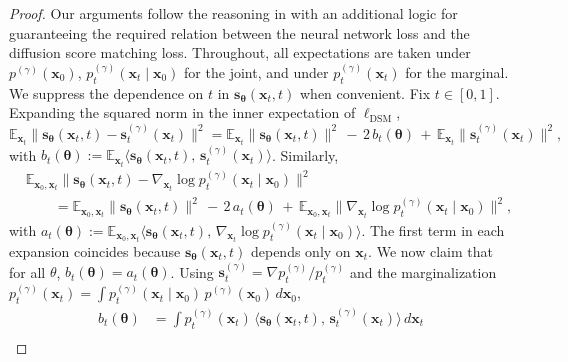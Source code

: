 \documentclass[11pt]{article}
\newcommand{\vect}[1]{\mathbf{#1}}
\theoremstyle{plain}
\newcommand{\1}{\mathbbm{1}}
\newcommand{\btheta}{{\boldsymbol{\theta}}}
\newcommand{\vx}{\vect{x}}
\newcommand{\vs}{\vect{s}}
\newcommand{\ldsm}{\ell_\mathrm{DSM}}
\newcommand{\pdist}[2][]{p_{#1}^{(#2)}}
\newcommand{\score}[2][]{\vect{s}_{#1}^{(#2)}}
\begin{document}
\begin{appendices}
\begin{proof}
Our arguments follow the reasoning in \cite{6795935} with an additional logic for guaranteeing the required relation between the neural network loss and the diffusion score matching loss.  
Throughout, all expectations are taken under $\pdist{\gamma}(\vx_0)$, $\pdist[t]{\gamma}(\vx_t\mid \vx_0)$ for the joint, and under $\pdist[t]{\gamma}(\vx_t)$ for the marginal. We suppress the dependence on $t$ in $\vs_\btheta(\vx_t, t)$ when convenient.
Fix $t \in [0,1]$. Expanding the squared norm in the inner expectation of $\ldsm$,
\begin{equation}
   \mathbb{E}_{\vx_t}\!\big\|\vs_\btheta(\vx_t,t) - \score[t]{\gamma}(\vx_t)\big\|^2
   = \mathbb{E}_{\vx_t}\|\vs_\btheta(\vx_t,t)\|^2 \,-\, 2\,b_t(\btheta) \,+\, \mathbb{E}_{\vx_t}\!\big\|\score[t]{\gamma}(\vx_t)\big\|^2,
   \label{eq:proof-esm-expand}
\end{equation}
with $b_t(\btheta) := \mathbb{E}_{\vx_t}\!\big\langle \vs_\btheta(\vx_t,t),\, \score[t]{\gamma}(\vx_t)\big\rangle$. Similarly,
\begin{align}\label{eq:proof-dsm-expand}
&\mathbb{E}_{\vx_0,\vx_t}\!\big\|\vs_\btheta(\vx_t,t) - \nabla_{\vx_t}\log \pdist[t]{\gamma}(\vx_t \mid \vx_0)\big\|^2\\\nonumber 
   &\qquad = \mathbb{E}_{\vx_0,\vx_t}\|\vs_\btheta(\vx_t, t)\|^2 \,-\, 2\,a_t(\btheta) \,+\, \mathbb{E}_{\vx_0,\vx_t}\!\big\|\nabla_{\vx_t}\log \pdist[t]{\gamma}(\vx_t\mid\vx_0)\big\|^2,
\end{align}
with $a_t(\btheta) := \mathbb{E}_{\vx_0,\vx_t}\!\big\langle \vs_\btheta(\vx_t,t),\, \nabla_{\vx_t}\log \pdist[t]{\gamma}(\vx_t\mid\vx_0)\big\rangle$. 
The first term in each expansion coincides because $\vs_\btheta(\vx_t,t)$ depends only on $\vx_t$. We now claim that for all $\theta$, $b_t(\btheta) = a_t(\btheta)$. Using $\score[t]{\gamma} = \nabla \pdist[t]{\gamma}/\pdist[t]{\gamma}$ and the marginalization $\pdist[t]{\gamma}(\vx_t) = \int \pdist[t]{\gamma}(\vx_t\mid\vx_0)\,\pdist{\gamma}(\vx_0)\, d\vx_0$,
\begin{align*}
   b_t(\btheta) 
   &= \int \pdist[t]{\gamma}(\vx_t)\,\big\langle \vs_\btheta(\vx_t,t),\, \score[t]{\gamma}(\vx_t)
   \big\rangle\, d\vx_t \\

\end{align*}
\end{proof}
\end{appendices}
\end{document}
